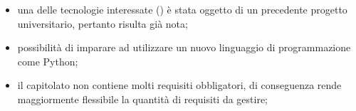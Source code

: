 \begin{itemize}
\item una delle tecnologie interessate () è stata oggetto di un precedente progetto universitario, pertanto risulta già nota;
\item possibilità di imparare ad utilizzare un nuovo linguaggio di programmazione come Python;
\item il capitolato non contiene molti requisiti obbligatori, di conseguenza rende maggiormente flessibile la quantità di requisiti da gestire;
\end{itemize}
